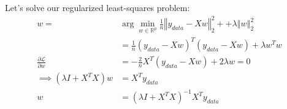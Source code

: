 Let's solve our regularized least-squares problem:
\begin{align*}
w =& \arg \min_{ w \in \mathbb{R}^{p}} \frac{1}{n}\left\Vert y_{data}-Xw \right\Vert_{2}^2+ + \lambda\left\Vert w\right\Vert^{2}_{2} \\
&= \frac{1}{n}\left(y_{data}-Xw\right)^{T}\left(y_{data}-Xw\right) + \lambda w^Tw\\
\frac{\partial\mathcal{L}}{\partial w } &= -\frac{2}{n}X^T\left(y_{data} - Xw\right) + 2\lambda w = 0\\
 \implies (\lambda I + X^TX )w &= X^Ty_{data} \\
  w &= \left(\lambda I + X^TX\right)^{-1} X^Ty_{data}
\end{align*}
